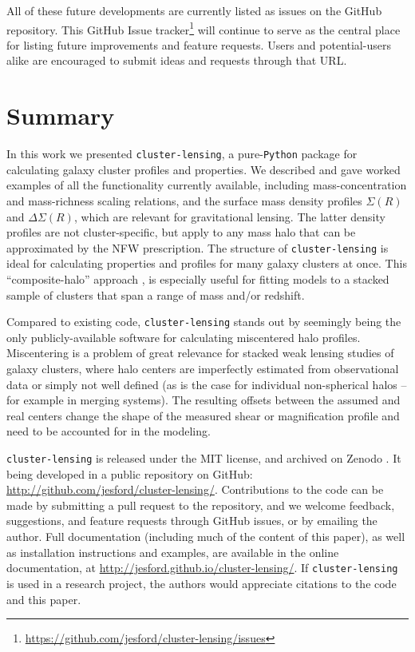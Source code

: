 \documentclass[twocolumn]{aastex6}
\newcommand{\code}{\lstinline[style=codeintext]}
\begin{document}
All of these future developments are currently listed as issues on the GitHub repository. This GitHub Issue tracker\footnote{\url{https://github.com/jesford/cluster-lensing/issues}} will continue to serve as the central place for listing future improvements and feature requests. Users and potential-users alike are encouraged to submit ideas and requests through that URL.


\section{Summary}
\label{summary}

In this work we presented \code{cluster-lensing}, a pure-\code{Python} package for calculating galaxy cluster profiles and properties. We described and gave worked examples of all the functionality currently available, including mass-concentration and mass-richness scaling relations, and the surface mass density profiles $\Sigma(R)$ and $\Delta\Sigma(R)$, which are relevant for gravitational lensing. The latter density profiles are not cluster-specific, but apply to any mass halo that can be approximated by the NFW prescription. The structure of \code{cluster-lensing} is ideal for calculating properties and profiles for many galaxy clusters at once. This ``composite-halo'' approach \citep[i.e.][]{Ford15}, is especially useful for fitting models to a stacked sample of clusters that span a range of mass and/or redshift.

Compared to existing code, \code{cluster-lensing} stands out by seemingly being the only publicly-available software for calculating miscentered halo profiles. Miscentering is a problem of great relevance for stacked weak lensing studies of galaxy clusters, where halo centers are imperfectly estimated from observational data or simply not well defined (as is the case for individual non-spherical halos -- for example in merging systems). The resulting offsets between the assumed and real centers change the shape of the measured shear or magnification profile and need to be accounted for in the modeling.

\code{cluster-lensing} is released under the MIT license, and archived on Zenodo \citep{clusterlensing}. It being developed in a public repository on GitHub: \url{http://github.com/jesford/cluster-lensing/}. Contributions to the code can be made by submitting a pull request to the repository, and we welcome feedback, suggestions, and feature requests through GitHub issues, or by emailing the author. Full documentation (including much of the content of this paper), as well as installation instructions and examples, are available in the online documentation, at \url{http://jesford.github.io/cluster-lensing/}. If \code{cluster-lensing} is used in a research project, the authors would appreciate citations to the code \citep[i.e.][]{clusterlensing} and this paper.
\end{document}
